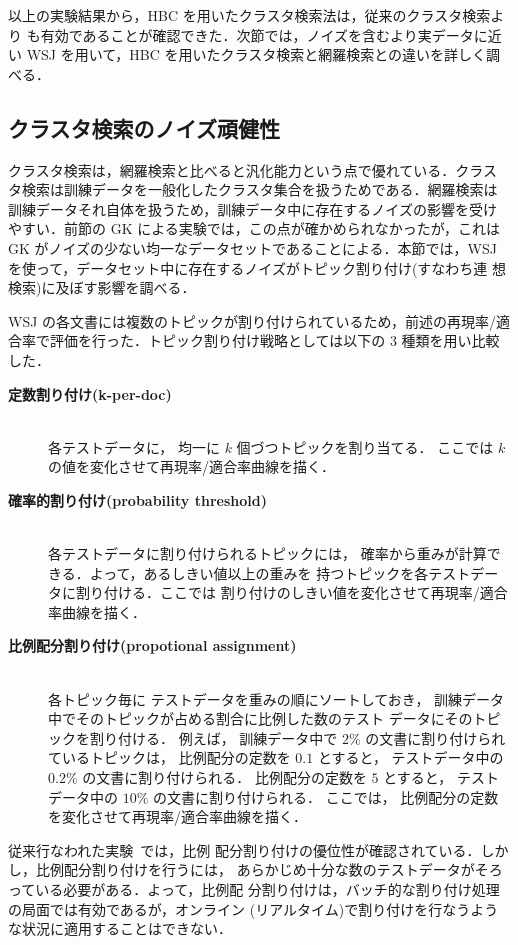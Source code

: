 以上の実験結果から，HBC を用いたクラスタ検索法は，従来のクラスタ検索より
も有効であることが確認できた．次節では，ノイズを含むより実データに近い 
WSJ を用いて，HBC を用いたクラスタ検索と網羅検索との違いを詳しく調べる．

\subsection{クラスタ検索のノイズ頑健性}

クラスタ検索は，網羅検索と比べると汎化能力という点で優れている．クラス
タ検索は訓練データを一般化したクラスタ集合を扱うためである．網羅検索は
訓練データそれ自体を扱うため，訓練データ中に存在するノイズの影響を受け
やすい．前節の GK による実験では，この点が確かめられなかったが，これは 
GK がノイズの少ない均一なデータセットであることによる．本節では，WSJ 
を使って，データセット中に存在するノイズがトピック割り付け(すなわち連
想検索)に及ぼす影響を調べる．

WSJ の各文書には複数のトピックが割り付けられているため，前述の再現率/適
合率で評価を行った．トピック割り付け戦略としては以下の 3 種類を用い比較
した．
\begin{description}
 \item[{\gt\bf 定数割り付け(k-per-doc)}]\strut\\
	    各テストデータに，
	    均一に $k$ 個づつトピックを割り当てる．
	    ここでは $k$ の値を変化させて再現率/適合率曲線を描く．
 \item[{\gt\bf 確率的割り付け(probability threshold)}]\strut\\
	    各テストデータに割り付けられるトピックには，
	    確率から重みが計算できる．よって，あるしきい値以上の重みを
	    持つトピックを各テストデータに割り付ける．ここでは
	    割り付けのしきい値を変化させて再現率/適合率曲線を描く．
 \item[{\gt\bf 比例配分割り付け(propotional assignment)~\cite{lewis:92:a}}]\strut\\
	    各トピック毎に
	    テストデータを重みの順にソートしておき，
	    訓練データ中でそのトピックが占める割合に比例した数のテスト
	    データにそのトピックを割り付ける．
	    例えば，
	    訓練データ中で $2\%$ の文書に割り付けられているトピックは，
	    比例配分の定数を $0.1$ とすると，
	    テストデータ中の $0.2\%$ の文書に割り付けられる．
	    比例配分の定数を $5$ とすると，
	    テストデータ中の $10\%$ の文書に割り付けられる．
	    ここでは，
	    比例配分の定数を変化させて再現率/適合率曲線を描く．
\end{description}
従来行なわれた実験~\cite{lewis:92:a,iwayama:94:b,nishino/95/a}では，比例
配分割り付けの優位性が確認されている．しかし，比例配分割り付けを行うには，
あらかじめ十分な数のテストデータがそろっている必要がある．よって，比例配
分割り付けは，バッチ的な割り付け処理の局面では有効であるが，オンライン
(リアルタイム)で割り付けを行なうような状況に適用することはできない．

